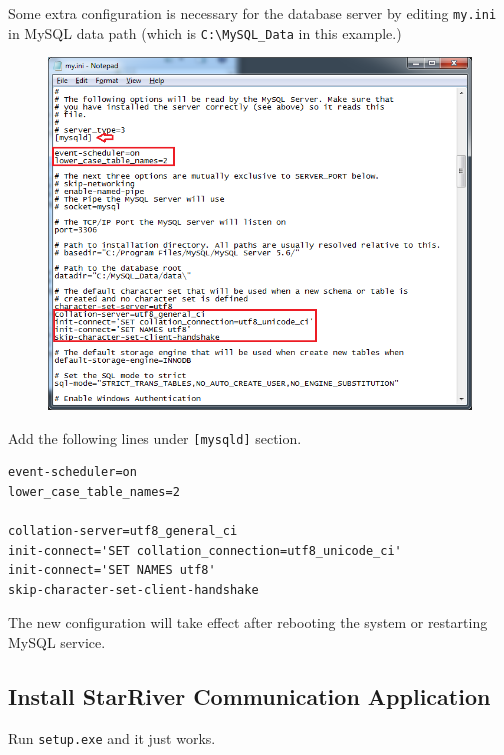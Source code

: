 Some extra configuration is necessary for the database server by editing
\texttt{my.ini} in MySQL data path (which is
\texttt{C:\textbackslash{}MySQL\_Data} in this example.)

\begin{figure}[htbp]
\centering
\includegraphics{../img/my_ini.png}
\end{figure}

Add the following lines under \texttt{{[}mysqld{]}} section.

\begin{verbatim}
event-scheduler=on
lower_case_table_names=2

collation-server=utf8_general_ci
init-connect='SET collation_connection=utf8_unicode_ci'
init-connect='SET NAMES utf8'
skip-character-set-client-handshake
\end{verbatim}

The new configuration will take effect after rebooting the system or
restarting MySQL service.

\subsection{Install StarRiver Communication
Application}\label{install-starriver-communication-application}

Run \texttt{setup.exe} and it just works.

